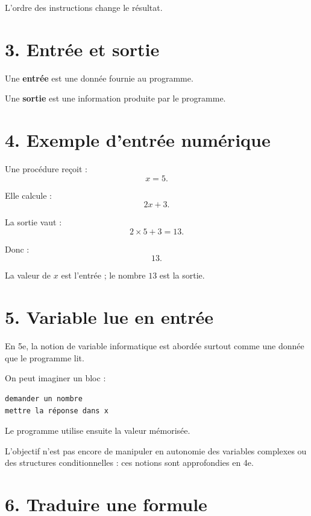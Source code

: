 L'ordre des instructions change le résultat.

\section{3. Entrée et sortie}

\begin{definition}
Une \textbf{entrée} est une donnée fournie au programme.

Une \textbf{sortie} est une information produite par le programme.
\end{definition}


\section{4. Exemple d'entrée numérique}

Une procédure reçoit :
\[
x=5.
\]

Elle calcule :
\[
2x+3.
\]

La sortie vaut :
\[
2\times5+3=13.
\]

Donc :
\[
\boxed{13}.
\]

La valeur de $x$ est l'entrée ; le nombre $13$ est la sortie.

\section{5. Variable lue en entrée}

En 5e, la notion de variable informatique est abordée surtout comme une donnée que le programme lit.

On peut imaginer un bloc :
\begin{verbatim}
demander un nombre
mettre la réponse dans x
\end{verbatim}

Le programme utilise ensuite la valeur mémorisée.

\begin{attention}
L'objectif n'est pas encore de manipuler en autonomie des variables complexes ou des structures conditionnelles : ces notions sont approfondies en 4e.
\end{attention}

\section{6. Traduire une formule}

